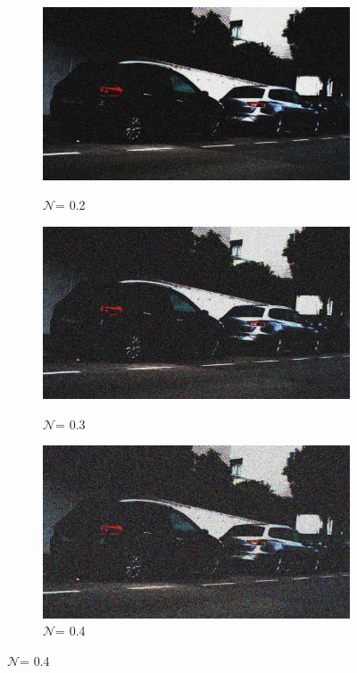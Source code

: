\documentclass[a4paper]{ctexart}
\begin{document}
\begin{figure}[htbp]
\begin{minipage}{0.98\textwidth}
\begin{subfigure}{0.08\textwidth}
				\caption*{$\mathcal{N}$= 0.2}
				\includegraphics[width=\linewidth]{picture/Edge Detection/degrade/RGB_001 Gamma=0.1, Gauss Noise=0.2}
				\label{fig：Gamma=0.1, Gauss Noise = 0.2}
			\end{subfigure}
			\begin{subfigure}{0.08\textwidth}
				\captionsetup{font=scriptsize}
				\caption*{$\mathcal{N}$= 0.3}
				\includegraphics[width=\linewidth]{picture/Edge Detection/degrade/RGB_001 Gamma=0.1, Gauss Noise=0.3}
				\label{fig：Gamma=0.1, Gauss Noise = 0.3}
			\end{subfigure}
			\begin{subfigure}{0.08\textwidth}
				\captionsetup{font=scriptsize}
				\caption*{$\mathcal{N}$= 0.4}
				\includegraphics[width=\linewidth]{picture/Edge Detection/degrade/RGB_001 Gamma=0.1, Gauss Noise=0.4}

\end{subfigure}
\end{minipage}
\end{figure}
\end{document}
